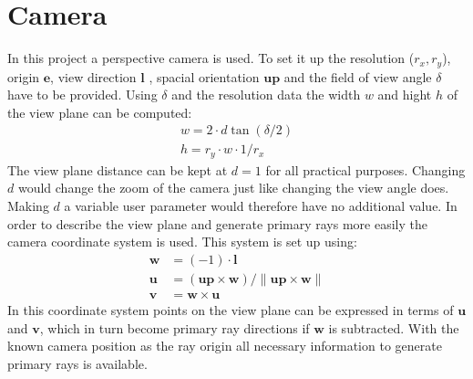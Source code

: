 \section{Camera}
In this project a perspective camera is used. To set it up the resolution ($r_x,r_y$), origin $\mathbf{e}$, view direction $\mathbf{l}$ , spacial orientation $\mathbf{up}$ and the field of view angle $\delta$ have to be provided. Using $\delta$ and the resolution data the width $w$ and hight $h$ of the view plane can be computed:
\begin{align}
w = 2 \cdot d \tan(\delta/2) \\
h = r_y \cdot w \cdot 1/r_x
\end{align}
The view plane distance can be kept at $d = 1$ for all practical purposes. Changing $d$ would change the zoom of the camera just like changing the view angle does. Making $d$ a variable user parameter would therefore have no additional value. 
In order to describe the view plane and generate primary rays more easily the camera coordinate system is used. This system is set up using:
\begin{align}
\mathbf{w} &= (-1) \cdot \mathbf{l} \\
\mathbf{u} &= (\mathbf{up} \times \mathbf{w})/ \|\mathbf{up} \times \mathbf{w} \| \\
\mathbf{v} &= \mathbf{w} \times \mathbf{u}
\end{align}
In this coordinate system points on the view plane can be expressed in terms of $\mathbf{u}$ and $\mathbf{v}$, which in turn become primary ray directions if $\mathbf{w}$ is subtracted. With the known camera position as the ray origin all necessary information to generate primary rays is available.

